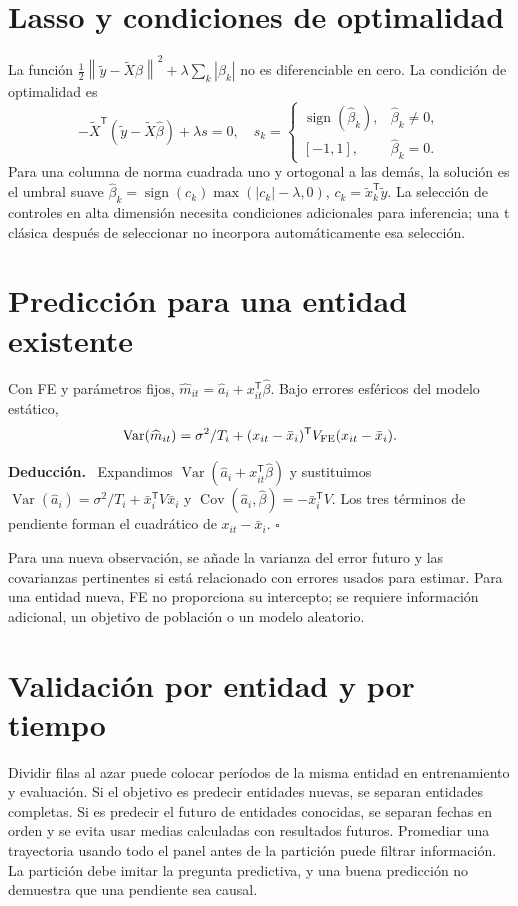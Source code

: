 \documentclass[11pt,a4paper]{article}
\newcommand{\T}{^{\mathsf T}}
\newcommand{\norm}[1]{\left\lVert #1\right\rVert}
\DeclareMathOperator{\Var}{Var}
\DeclareMathOperator{\Cov}{Cov}
\DeclareMathOperator{\sign}{sign}
\newenvironment{deduccion}{\par\textbf{Deducción.}\ }{\hfill$\square$\par}
\theoremstyle{definition}
\begin{document}
\section{Lasso y condiciones de optimalidad}
La función
$\tfrac12\norm{\widetilde y-\widetilde X\beta}^2+\lambda\sum_k|\beta_k|$
no es diferenciable en cero.
La condición de optimalidad es
\[
-\widetilde X\T(\widetilde y-\widetilde X\widehat\beta)+\lambda s=0,
\quad
s_k=\begin{cases}\sign(\widehat\beta_k),&\widehat\beta_k\ne0,\\
[-1,1],&\widehat\beta_k=0.\end{cases}
\]
Para una columna de norma cuadrada uno y ortogonal a las demás,
la solución es el umbral suave
$\widehat\beta_k=\sign(c_k)\max(|c_k|-\lambda,0)$,
$c_k=\widetilde x_k\T\widetilde y$.
La selección de controles en alta dimensión necesita condiciones adicionales para inferencia; una t clásica después de seleccionar no incorpora automáticamente esa selección.

\section{Predicción para una entidad existente}
Con FE y parámetros fijos,
$\widehat m_{it}=\widehat a_i+x_{it}\T\widehat\beta$.
Bajo errores esféricos del modelo estático,
\[
\Var(\widehat m_{it})
=\sigma^2/T_i+
(x_{it}-\bar x_i)\T V_{\rm FE}(x_{it}-\bar x_i).
\]
\begin{deduccion}
Expandimos $\Var(\widehat a_i+x_{it}\T\widehat\beta)$ y sustituimos
$\Var(\widehat a_i)=\sigma^2/T_i+\bar x_i\T V\bar x_i$ y
$\Cov(\widehat a_i,\widehat\beta)=-\bar x_i\T V$.
Los tres términos de pendiente forman el cuadrático de $x_{it}-\bar x_i$.
\end{deduccion}
Para una nueva observación, se añade la varianza del error futuro y las covarianzas pertinentes si está relacionado con errores usados para estimar.
Para una entidad nueva, FE no proporciona su intercepto; se requiere información adicional, un objetivo de población o un modelo aleatorio.

\section{Validación por entidad y por tiempo}
Dividir filas al azar puede colocar períodos de la misma entidad en entrenamiento y evaluación.
Si el objetivo es predecir entidades nuevas, se separan entidades completas.
Si es predecir el futuro de entidades conocidas, se separan fechas en orden y se evita usar medias calculadas con resultados futuros.
Promediar una trayectoria usando todo el panel antes de la partición puede filtrar información.
La partición debe imitar la pregunta predictiva, y una buena predicción no demuestra que una pendiente sea causal.
\end{document}
